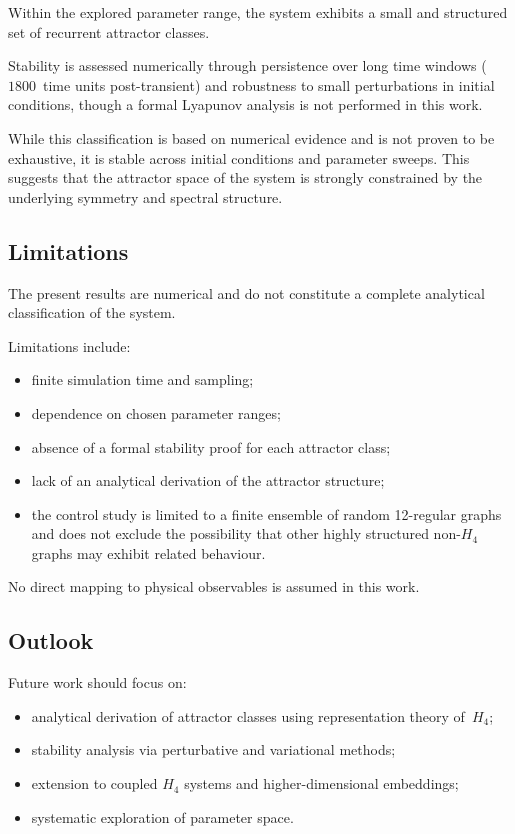 \documentclass[12pt,a4paper]{article}
\newcommand{\Hfour}{H_4}
\begin{document}
Within the explored parameter range, the system exhibits a small and
structured set of recurrent attractor classes.

Stability is assessed numerically through persistence over long time
windows ($1800$~time units post-transient) and robustness to small
perturbations in initial conditions, though a formal Lyapunov analysis
is not performed in this work.

While this classification is based on numerical evidence and is not
proven to be exhaustive, it is stable across initial conditions and
parameter sweeps.  This suggests that the attractor space of the system
is strongly constrained by the underlying symmetry and spectral
structure.

\subsection{Limitations}\label{sec:limitations}

The present results are numerical and do not constitute a complete
analytical classification of the system.

Limitations include:
\begin{itemize}[nosep]
\item finite simulation time and sampling;
\item dependence on chosen parameter ranges;
\item absence of a formal stability proof for each attractor class;
\item lack of an analytical derivation of the attractor structure;
\item the control study is limited to a finite ensemble of random
  12-regular graphs and does not exclude the possibility that other
  highly structured non-$\Hfour$ graphs may exhibit related behaviour.
\end{itemize}

No direct mapping to physical observables is assumed in this work.

\subsection{Outlook}\label{sec:outlook}

Future work should focus on:
\begin{itemize}[nosep]
\item analytical derivation of attractor classes using representation
  theory of~$\Hfour$;
\item stability analysis via perturbative and variational methods;
\item extension to coupled $\Hfour$ systems and higher-dimensional
  embeddings;
\item systematic exploration of parameter space.
\end{itemize}
\end{document}
